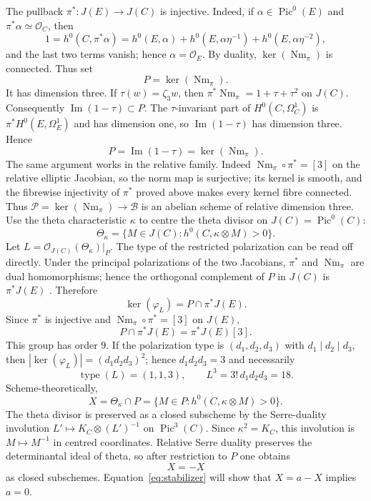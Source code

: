 \documentclass[10pt]{amsart}
\numberwithin{equation}{section}
\theoremstyle{definition}
\theoremstyle{remark}
\newcommand{\Nm}{\operatorname{Nm}}
\newcommand{\cB}{\mathcal B}
\newcommand{\cP}{\mathcal P}
\begin{document}
The pullback $\pi^*:J(E)\to J(C)$ is injective.  Indeed, if
$\alpha\in\operatorname{Pic}^0(E)$ and $\pi^*\alpha\simeq\mathcal O_C$, then
\[
 1=h^0(C,\pi^*\alpha)
  =h^0(E,\alpha)+h^0(E,\alpha\eta^{-1})
   +h^0(E,\alpha\eta^{-2}),
\]
and the last two terms vanish; hence $\alpha=\mathcal O_E$.  By duality,
$\ker(\Nm_\pi)$ is connected.  Thus set
\[
 P=\ker(\Nm_\pi).
\]
It has dimension three.  If $\tau(w)=\zeta_3w$, then
$\pi^*\Nm_\pi=1+\tau+\tau^2$ on $J(C)$.  Consequently
$\operatorname{Im}(1-\tau)\subset P$.  The $\tau$-invariant part of
$H^0(C,\Omega_C^1)$ is $\pi^*H^0(E,\Omega_E^1)$ and has dimension one, so
$\operatorname{Im}(1-\tau)$ has dimension three.  Hence
\begin{equation}
 P=\operatorname{Im}(1-\tau)=\ker(\Nm_\pi).
\label{eq:prym-conventions}
\end{equation}
The same argument works in the relative family.  Indeed
$\Nm_\pi\circ\pi^*=[3]$ on the relative elliptic Jacobian, so the norm map
is surjective; its kernel is smooth, and the fibrewise injectivity of
$\pi^*$ proved above makes every kernel fibre connected.  Thus
$\cP=\ker(\Nm_\pi)\to\cB$ is an abelian scheme of relative dimension
three.
Use the theta characteristic $\kappa$ to centre the theta divisor on
$J(C)=\operatorname{Pic}^0(C)$:
\[
 \Theta_\kappa=\{M\in J(C):h^0(C,\kappa\otimes M)>0\}.
\]
Let $L=\mathcal O_{J(C)}(\Theta_\kappa)|_P$.  The type of the restricted
polarization can be read off directly.  Under the principal polarizations of
the two Jacobians, $\pi^*$ and $\Nm_\pi$ are dual homomorphisms; hence the
orthogonal complement of $P$ in $J(C)$ is $\pi^*J(E)$
\cite[Section~12.3]{BirkenhakeLange2004}.  Therefore
\[
 \ker(\varphi_L)=P\cap\pi^*J(E).
\]
Since $\pi^*$ is injective and $\Nm_\pi\circ\pi^*=[3]$ on $J(E)$,
\[
 P\cap\pi^*J(E)=\pi^*J(E)[3].
\]
This group has order $9$.  If the polarization type is
$(d_1,d_2,d_3)$ with $d_1\mid d_2\mid d_3$, then
$|\ker(\varphi_L)|=(d_1d_2d_3)^2$; hence $d_1d_2d_3=3$ and necessarily
\begin{equation}
 \operatorname{type}(L)=(1,1,3),
 \qquad L^3=3!\,d_1d_2d_3=18.
\label{eq:prym-polarization}
\end{equation}
Scheme-theoretically,
\[
 X=\Theta_\kappa\cap P
  =\{M\in P:h^0(C,\kappa\otimes M)>0\}.
\]
The theta divisor is preserved as a closed subscheme by the Serre-duality
involution $L'\mapsto K_C\otimes(L')^{-1}$ on $\operatorname{Pic}^3(C)$.
Since $\kappa^2=K_C$, this involution is $M\mapsto M^{-1}$ in centred
coordinates.  Relative Serre duality preserves the determinantal ideal of
theta, so after restriction to $P$ one obtains
\begin{equation}
 X=-X
\label{eq:symmetry}
\end{equation}
as closed subschemes.  Equation~\eqref{eq:stabilizer} will show that
$X=a-X$ implies $a=0$.
\end{document}
